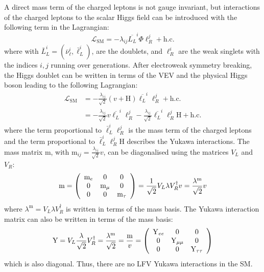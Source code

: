 A direct mass term of the charged leptons is not gauge invariant, but interactions of the charged leptons to the scalar Higgs field can be introduced with the following term in the Lagrangian:
%
\begin{equation}
  \mathcal{L}_{\text{SM}}=-\lambda_{i j} \overline{L_{L}}^{i} \Phi \ell_{R}^{j}+ \text{h.c.}
\end{equation}
%
where with $\bar{L}_{L}^{i}=(\bar{\nu}_{\ell}^{i}, \bar{\ell}_{L}^{i})$, are the \iso doublets, and $\ell_{R}^{i}$ are the weak singlets with the indices $i, j$ running over generations. After electroweak symmetry breaking, the Higgs doublet can be written in terms of the VEV and the physical Higgs boson leading to the following Lagrangian:
%
\begin{equation}
  \begin{aligned}
    \mathcal{L}_{\text{SM}} &=-\frac{\lambda_{i j}}{\sqrt{2}}(v + \text{H}) \overline{\ell_{L}}^{i} \ell_{R}^{j}+ \text{h.c.} \\
    &=-\frac{\lambda_{i j}}{\sqrt{2}} v \overline{\ell_{L}}^{i} \ell_{R}^{j} - \frac{\lambda_{i j}}{\sqrt{2}} \overline{\ell_{L}}^{i} \ell_{R}^{j} \text{H} + \text{h.c.}
  \end{aligned}
\end{equation}
%
where the term proportional to $\bar{\ell}_{L}^{i} \ell_{R}^{j}$ is the mass term of the charged leptons and the term proportional to $\bar{\ell}_{L}^{i} \ell_{R}^{j} \text{H}$ describes the Yukawa interactions. The mass matrix m, with $\text{m}_{ij}=\frac{\lambda_{ij}}{\sqrt{2}} v$, can be diagonalised using the matrices $V_{L}$ and $V_{R}$:
%
\begin{equation}
  \text{m} = \left(\begin{array}{ccc}
  \text{m}_{e} & 0 & 0 \\
  0 & \text{m}_{\mu} & 0 \\
  0 & 0 & \text{m}_{\tau}
  \end{array}\right)=\frac{1}{\sqrt{2}} V_{L} \lambda V_{R}^{\dagger} v=\frac{\lambda^{\text{m}}}{\sqrt{2}} v
\end{equation}
%
where $\lambda^{\text{m}}=V_{L} \lambda V_{R}^{\dagger}$ is written in terms of the mass basis. The Yukawa interaction matrix can also be written in terms of the mass basis:
%
\begin{equation}
  \text{Y}=V_{L} \frac{\lambda}{\sqrt{2}} V_{R}^{\dagger}=\frac{\lambda^{\text{m}}}{\sqrt{2}}=\frac{\text{m}}{v}=\left(\begin{array}{ccc}
  \text{Y}_{\textit{e}\textit{e}} & 0 & 0 \\
  0 & \text{Y}_{\mu\mu} & 0 \\
  0 & 0 & \text{Y}_{\tau\tau}
  \end{array}\right)
\end{equation}
%
which is also diagonal. Thus, there are no LFV Yukawa interactions in the SM.

